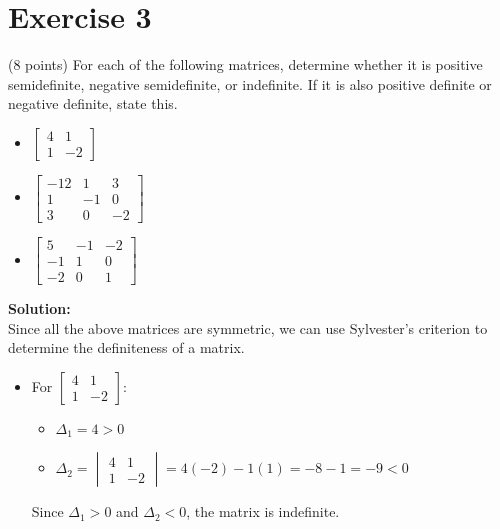 \documentclass{article}
\begin{document}
\section*{Exercise 3}
(8 points) For each of the following matrices, determine whether it is positive semidefinite, negative semidefinite, or indefinite. If it is also positive definite or negative definite, state this.
\begin{itemize}
\item $\begin{bmatrix} 4 & 1 \\ 1 & -2 \end{bmatrix}$

\item $\begin{bmatrix} -12 & 1 & 3 \\ 1 & -1 & 0 \\ 3 & 0 & -2 \end{bmatrix}$

\item $\begin{bmatrix} 5 & -1 & -2 \\ -1 & 1 & 0 \\ -2 & 0 & 1 \end{bmatrix}$
\end{itemize}

\textbf{Solution: } \\

Since all the above matrices are symmetric, we can use Sylvester's criterion to determine the definiteness of a matrix. \\

\begin{itemize}
\item For $\begin{bmatrix} 4 & 1 \\ 1 & -2 \end{bmatrix}$:
\begin{itemize}
\item $\Delta_1 = 4 > 0$
\item $\Delta_2 = \begin{vmatrix} 4 & 1 \\ 1 & -2 \end{vmatrix} = 4(-2) - 1(1) = -8 - 1 = -9 < 0$
\end{itemize}
Since $\Delta_1 > 0$ and $\Delta_2 < 0$, the matrix is indefinite.
\end{itemize}
\end{document}
